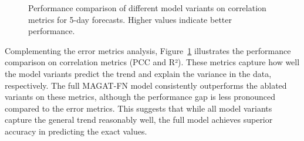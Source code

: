 \documentclass[lettersize, journal]{IEEEtran}
\begin{document}
\begin{figure}[htbp]
    \centering
    \hfill
    \caption{Performance comparison of different model variants on correlation metrics for 5-day forecasts. Higher values indicate better performance.}
    \label{fig:ablation_correlation_metrics}
\end{figure}

Complementing the error metrics analysis, Figure~\ref{fig:ablation_correlation_metrics} illustrates the performance comparison on correlation metrics (PCC and R²). These metrics capture how well the model variants predict the trend and explain the variance in the data, respectively. The full MAGAT-FN model consistently outperforms the ablated variants on these metrics, although the performance gap is less pronounced compared to the error metrics. This suggests that while all model variants capture the general trend reasonably well, the full model achieves superior accuracy in predicting the exact values.
\end{document}
